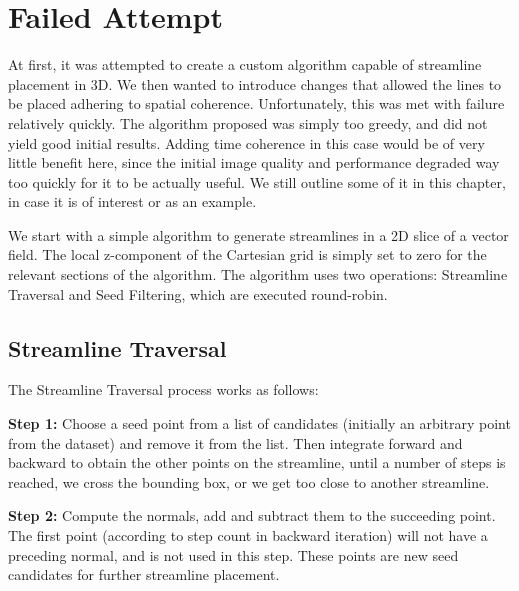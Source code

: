 \section{Failed Attempt}
\begin{leftbar}
    \noindent
    At first, it was attempted to create a custom algorithm capable of streamline placement in 3D.
    We then wanted to introduce changes that allowed the lines to be placed adhering to spatial coherence.
    Unfortunately, this was met with failure relatively quickly.
    The algorithm proposed was simply too greedy, and did not yield good initial results.
    Adding time coherence in this case would be of very little benefit here, since the initial image quality and performance degraded way too quickly for it to be actually useful.
    We still outline some of it in this chapter, in case it is of interest or as an example.
\end{leftbar}
\noindent
We start with a simple algorithm to generate streamlines in a 2D slice of a vector field.
The local z-component of the Cartesian grid is simply set to zero for the relevant sections of the algorithm.
The algorithm uses two operations: Streamline Traversal and Seed Filtering, which are executed round-robin.
\subsection{Streamline Traversal}
The Streamline Traversal process works as follows:
\begin{itemize}
    \begin{minipage}{.6\textwidth}
    \item \textbf{Step 1:}
    Choose a seed point from a list of candidates (initially an arbitrary point from the dataset) and remove it from the list.
    Then integrate forward and backward to obtain the other points on the streamline, until
    a number of steps is reached, we cross the bounding box, or we get too close to another streamline.
    \item \textbf{Step 2:}
    Compute the normals, add and subtract them to the succeeding point. The first point (according to step count in backward iteration) will not have a preceding normal, and is not used in this step. These points are new seed candidates for further streamline placement.
    \end{minipage}
    \begin{minipage}{.3\textwidth}
    
    \end{minipage}
\end{itemize}
